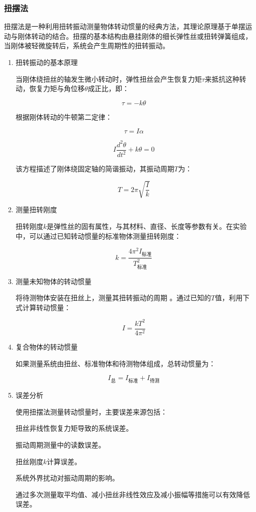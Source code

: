 \documentclass[12pt,hyperref,a4paper,UTF8]{ctexart}
\begin{document}
\subsubsection{扭摆法}

扭摆法是一种利用扭转振动测量物体转动惯量的经典方法，其理论原理基于单摆运动与刚体转动的结合。扭摆的基本结构由悬挂刚体的细长弹性丝或扭转弹簧组成，当刚体被轻微旋转后，系统会产生周期性的扭转振动。
\begin{enumerate}
    

\item 扭转振动的基本原理

当刚体绕扭丝的轴发生微小转动时，弹性扭丝会产生恢复力矩$\tau$来抵抗这种转动，恢复力矩与角位移$\theta$成正比，即：

$$ \tau = -k \theta $$

根据刚体转动的牛顿第二定律：

$$ \tau = I \alpha $$

$$ I \frac{d^2\theta}{dt^2} + k\theta = 0 $$

该方程描述了刚体绕固定轴的简谐振动，其振动周期$T$为：

$$T = 2\pi \sqrt{\frac{I}{k}}$$

\item 测量扭转刚度 

扭转刚度$k$是弹性丝的固有属性，与其材料、直径、长度等参数有关。在实验中，可以通过已知转动惯量的标准物体测量扭转刚度：

$$k = \frac{4\pi^2 I_{\text{标准}}}{T_{\text{标准}}^2}$$

\item 测量未知物体的转动惯量

将待测物体安装在扭丝上，测量其扭转振动的周期 。通过已知的$T$值，利用下式计算转动惯量：

$$I = \frac{k T^2}{4\pi^2}$$

\item 复合物体的转动惯量

如果测量系统由扭丝、标准物体和待测物体组成，总转动惯量为：

$$I_{\text{总}} = I_{\text{标准}} + I_{\text{待测}}$$

\item 误差分析

使用扭摆法测量转动惯量时，主要误差来源包括：

扭丝非线性恢复力矩导致的系统误差。

振动周期测量中的读数误差。

扭丝刚度$k$计算误差。

系统外界扰动对振动周期的影响。


通过多次测量取平均值、减小扭丝非线性效应及减小振幅等措施可以有效降低误差。

\end{enumerate}
\end{document}
